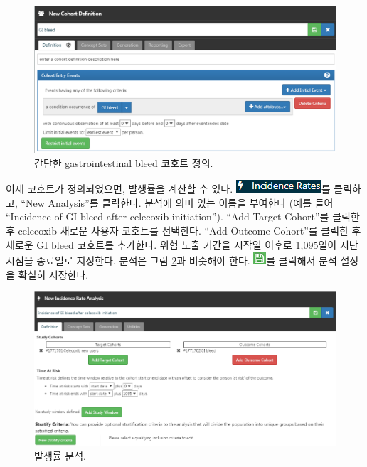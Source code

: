 \documentclass[10.5pt]{book}
\theoremstyle{definition}
\theoremstyle{definition}
\theoremstyle{definition}
\theoremstyle{remark}
\begin{document}
\begin{figure}

{\centering \includegraphics[width=1\linewidth]{images/SuggestedAnswers/giBleedCohortDefinition} 

}

\caption{간단한 gastrointestinal bleed 코호트 정의.}\label{fig:giBleedCohortDefinition}
\end{figure}

이제 코호트가 정의되었으면, 발생률을 계산할 수 있다.
\includegraphics{images/Characterization/atlasIncidenceMenuItem.png}를
클릭하고, ``New Analysis''를 클릭한다. 분석에 의미 있는 이름을 부여한다
(예를 들어 ``Incidence of GI bleed after celecoxib initiation''). ``Add
Target Cohort''를 클릭한 후 celecoxib 새로운 사용자 코호트를 선택한다.
``Add Outcome Cohort''를 클릭한 후 새로운 GI bleed 코호트를 추가한다.
위험 노출 기간을 시작일 이후로 1,095일이 지난 시점을 종료일로 지정한다.
분석은 그림 \ref{fig:irAnalysis}과 비슷해야 한다.
\includegraphics{images/Cohorts/save.png}를 클릭해서 분석 설정을 확실히
저장한다.

\begin{figure}

{\centering \includegraphics[width=1\linewidth]{images/SuggestedAnswers/irAnalysis} 

}

\caption{발생률 분석.}\label{fig:irAnalysis}
\end{figure}
\end{document}
